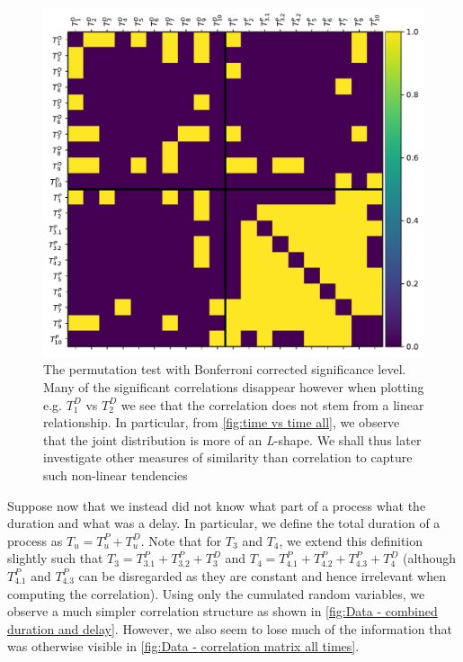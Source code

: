 \documentclass[../Thesis.tex]{subfiles}
\begin{document}
\begin{figure}[ht]
    \centering
    \includegraphics[width=.9\linewidth]{figures/Multiple cycles data/Permutation test rho 10 mil - bonferoni.pdf}
    \caption{The permutation test with Bonferroni corrected significance level. Many of the significant correlations disappear however when plotting e.g. $T^D_1$ vs $T^D_2$ we see that the correlation does not stem from a linear relationship. In particular, from \autoref{fig:time vs time all}, we observe that the joint distribution is more of an \textit{L}-shape. We shall thus later investigate other measures of similarity than correlation to capture such non-linear tendencies}
    \label{fig:Data - perm test result - Bonferroni}
\end{figure}

Suppose now that we instead did not know what part of a process what the duration and what was a delay. In particular, we define the total duration of a process as $T_u = T^P_u + T^D_u$. Note that for $T_3$ and $T_4$, we extend this definition slightly such that $T_3 = T^P_{3.1} + T^P_{3.2} + T^D_{3}$ and $T_4 = T^P_{4.1} + T^P_{4.2} + T^P_{4.3} + T^D_{4}$ (although $T^P_{4.1}$ and $T^P_{4.3}$ can be disregarded as they are constant and hence irrelevant when computing the correlation). Using only the cumulated random variables, we observe a much simpler correlation structure as shown in \autoref{fig:Data - combined duration and delay}. However, we also seem to lose much of the information that was otherwise visible in \autoref{fig:Data - correlation matrix all times}.
\end{document}

